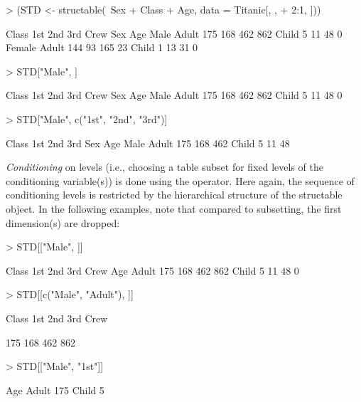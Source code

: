 \documentclass{Z}
\newcommand{\class}[1]{\textsf{#1}}
\begin{document}
\begin{Schunk}
\begin{Sinput}
> (STD <- structable(~Sex + Class + Age, data = Titanic[, , 
+     2:1, ]))
\end{Sinput}
\begin{Soutput}
             Class 1st 2nd 3rd Crew
Sex    Age                         
Male   Adult       175 168 462  862
       Child         5  11  48    0
Female Adult       144  93 165   23
       Child         1  13  31    0
\end{Soutput}
\begin{Sinput}
> STD["Male", ]
\end{Sinput}
\begin{Soutput}
           Class 1st 2nd 3rd Crew
Sex  Age                         
Male Adult       175 168 462  862
     Child         5  11  48    0
\end{Soutput}
\begin{Sinput}
> STD["Male", c("1st", "2nd", "3rd")]
\end{Sinput}
\begin{Soutput}
           Class 1st 2nd 3rd
Sex  Age                    
Male Adult       175 168 462
     Child         5  11  48
\end{Soutput}
\end{Schunk}


\noindent \emph{Conditioning} on levels (i.e., choosing a table subset for fixed levels
of the conditioning variable(s)) is done using the \code{[[} operator. %
Here again, the sequence of conditioning levels is restricted by the
hierarchical structure of the \class{structable} object. In the
following examples, note that compared to subsetting, the first
dimension(s) are dropped:

\begin{Schunk}
\begin{Sinput}
> STD[["Male", ]]
\end{Sinput}
\begin{Soutput}
      Class 1st 2nd 3rd Crew
Age                         
Adult       175 168 462  862
Child         5  11  48    0
\end{Soutput}
\begin{Sinput}
> STD[[c("Male", "Adult"), ]]
\end{Sinput}
\begin{Soutput}
Class 1st 2nd 3rd Crew
                      
      175 168 462  862
\end{Soutput}
\begin{Sinput}
> STD[["Male", "1st"]]
\end{Sinput}
\begin{Soutput}
Age       
Adult  175
Child    5
\end{Soutput}
\end{Schunk}
\end{document}
